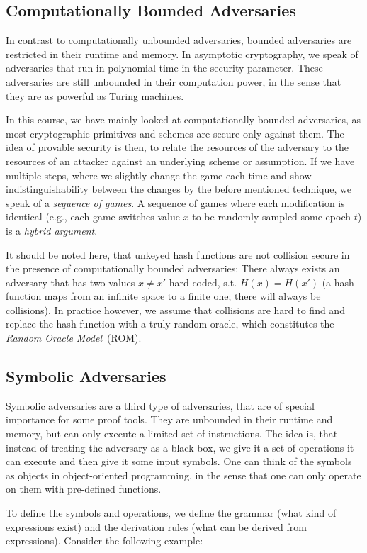 \subsection{Computationally Bounded Adversaries}
In contrast to computationally unbounded adversaries, bounded adversaries are restricted in their runtime and memory.
In asymptotic cryptography, we speak of adversaries that run in polynomial time in the security parameter.
These adversaries are still unbounded in their computation power, in the sense that they are as powerful as Turing machines.

In this course, we have mainly looked at computationally bounded adversaries,
as most cryptographic primitives and schemes are secure only against them.
The idea of provable security is then, to relate the resources of the adversary to the resources of an attacker against an underlying scheme or assumption.
If we have multiple steps, where we slightly change the game each time and show indistinguishability between the changes by the before mentioned technique,
we speak of a \emph{sequence of games}.
A sequence of games where each modification is identical (e.g., each game switches value $x$ to be randomly sampled some epoch $t$) is a \emph{hybrid argument}.

It should be noted here, that unkeyed hash functions are not collision secure in the presence of computationally bounded adversaries:
There always exists an adversary that has two values $x\not= x'$ hard coded, s.t. $H(x)=H(x')$ (a hash function maps from an infinite space to a finite one; there will always be collisions).
In practice however, we assume that collisions are hard to find and replace the hash function with a truly random oracle, which constitutes the \emph{Random Oracle Model}~(ROM).

\subsection{Symbolic Adversaries}
Symbolic adversaries are a third type of adversaries, that are of special importance for some proof tools.
They are unbounded in their runtime and memory, but can only execute a limited set of instructions.
The idea is, that instead of treating the adversary as a black-box, we give it a set of operations it can execute and then give it some input symbols.
One can think of the symbols as objects in object-oriented programming, in the sense that one can only operate on them with pre-defined functions.

To define the symbols and operations, we define the grammar (what kind of expressions exist) and the derivation rules (what can be derived from expressions).
Consider the following example:


